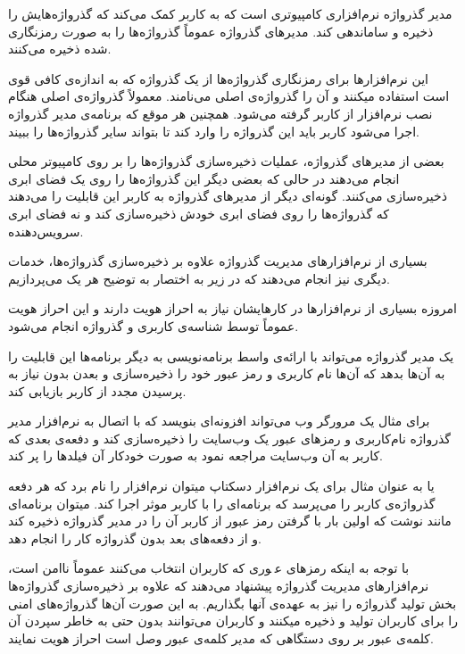 
مدیر گذرواژه نرم‌افزاری کامپیوتری است که به کاربر کمک می‌کند که گذرواژه‌هایش را ذخیره و ساماندهی کند. مدیر‌های گذرواژه عموماً گذرواژه‌ها را به صورت رمزنگاری شده ذخیره می‌کنند. 

این نرم‌افزارها برای رمزنگاری گذرواژه‌ها از یک گذرواژه‌ که به اندازه‌ی کافی قوی است استفاده میکنند و آن را گذرواژه‌ی اصلی می‌نامند. معمولاً گذرواژه‌ی اصلی هنگام نصب نرم‌افزار از کاربر گرفته می‌شود. همچنین هر موقع که برنامه‌ی مدیر گذرواژه اجرا می‌شود کاربر باید این گذرواژه را وارد کند تا بتواند سایر گذرواژه‌ها را ببیند.

بعضی از مدیر‌های گذرواژه، عملیات ذخیره‌سازی گذرواژه‌ها را بر روی کامپیوتر محلی انجام می‌دهند در حالی که بعضی دیگر این گذرواژه‌ها را روی یک فضای ابری ذخیره‌سازی می‌کنند. گونه‌ای دیگر از مدیر‌های گذرواژه  به کاربر این قابلیت را می‌دهند که گذرواژه‌ها را روی فضای ابری خودش ذخیره‌سازی کند و نه فضای ابری سرویس‌دهنده.

بسیاری از نرم‌افزار‌های مدیریت گذرواژه علاوه بر ذخیره‌سازی گذرواژه‌ها، خدمات دیگری نیز انجام می‌دهند که در زیر به اختصار به توضیح هر یک می‌پردازیم.


امروزه بسیاری از نرم‌افزارها در کارهایشان نیاز به احراز هویت دارند و این احراز هویت عموماً توسط شناسه‌ی کاربری و گذرواژه انجام می‌شود. 

یک مدیر گذرواژه می‌تواند با ارائه‌ی واسط برنامه‌نویسی به دیگر برنامه‌ها این قابلیت را به آن‌ها بدهد که آن‌ها نام کاربری و رمز عبور خود را ذخیره‌سازی و بعدن بدون نیاز به پرسیدن مجدد از کاربر بازیابی کند.

برای مثال یک مرورگر وب می‌تواند افزونه‌ای بنویسد که با اتصال به نرم‌افزار مدیر گذرواژه نام‌کاربری و رمز‌های عبور یک وب‌سایت را ذخیره‌سازی کند و دفعه‌ی بعدی که کاربر به آن وب‌سایت مراجعه نمود به صورت خودکار آن فیلد‌ها را پر کند. 

یا به عنوان مثال برای یک نرم‌افزار دسکتاپ میتوان نرم‌افزار  را نام برد که هر دفعه گذرواژه‌ی کاربر را می‌پرسد که برنامه‌ای را با کاربر موثر  اجرا کند. میتوان برنامه‌ای مانند  نوشت که اولین بار با گرفتن رمز عبور از کاربر آن را در مدیر گذرواژه ذخیره کند و از دفعه‌های بعد بدون گذرواژه کار را انجام دهد.


با توجه به اینکه رمزهای عبٖوری که کاربران انتخاب می‌کنند عموماً ناامن است، نرم‌افزارهای مدیریت گذرواژه پیشنهاد می‌دهند که علاوه بر ذخیره‌سازی گذرواژه‌ها بخش تولید گذرواژه را نیز به عهده‌ی آنها بگذاریم. به این صورت آن‌ها گذرواژه‌های امنی را برای کاربران تولید و ذخیره میکنند و کاربران می‌توانند بدون حتی به خاطر سپردن آن کلمه‌ی عبور بر روی دستگاهی که مدیر کلمه‌ی عبور وصل است احراز هویت نمایند.
